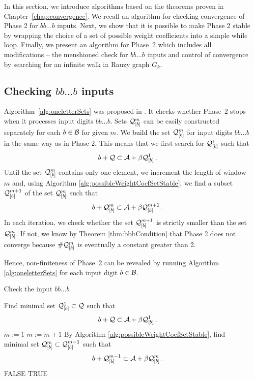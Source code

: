 

In this section, we introduce algorithms based on the theorems proven in Chapter~\ref{chap:convergence}. We recall an algorithm for checking convergence of Phase 2 for $bb\dots b$ inputs. Next, we show that it is possible to make Phase 2 stable by wrapping the choice of a set of possible weight coefficients into a simple while loop. Finally, we present an algorithm for Phase~2 which includes all modifications -- the menshioned check for $bb\dots b$ inputs and control of convergence by searching for an infinite walk in Rauzy graph $G_k$.

\subsection*{Checking $bb\dots b$ inputs}

Algorithm~\ref{alg:oneletterSets} was proposed in \cite{vu}. It checks whether Phase~2 stops when it processes input digits $bb\dots b$.
Sets $\mathcal{Q}_{[\scriptstyle b]}^{\scriptstyle m}$  can be easily constructed separately for each $b\in\mathcal{B}$ for given $m$. We build the set $\mathcal{Q}_{[\scriptstyle b]}^{\scriptstyle m}$ for input digits $bb\dots b$ in the same way as in Phase 2. This means that we first search for $\mathcal{Q}_{[\scriptstyle b]}^{\scriptstyle 1}$ such that 
$$
b + \mathcal{Q} \subset \mathcal{A} + \beta \mathcal{Q}_{[\scriptstyle b]}^{\scriptstyle 1}\,.
$$
Until the set $\mathcal{Q}_{[\scriptstyle b]}^{\scriptstyle m}$ contains only one element, we increment the length of  window $m$ and, using Algorithm \ref{alg:possibleWeightCoefSetStable}, we find a subset $\mathcal{Q}_{[\scriptstyle b]}^{\scriptstyle m+1}$ of the set $\mathcal{Q}_{[\scriptstyle b]}^{\scriptstyle m}$ such that
$$
b + \mathcal{Q}_{[\scriptstyle b]}^{\scriptstyle m} \subset \mathcal{A} + \beta \mathcal{Q}_{[\scriptstyle b]}^{\scriptstyle m+1}\,.
$$
In each iteration, we check whether the set $\mathcal{Q}_{[\scriptstyle b]}^{\scriptstyle m+1}$ is strictly smaller than the set $\mathcal{Q}_{[\scriptstyle b]}^{\scriptstyle m}$. If not, we know by Theorem \ref{thm:bbbCondition} that Phase 2 does not converge because $\#\mathcal{Q}_{[\scriptstyle b]}^{\scriptstyle m}$ is eventually a constant greater than 2.

Hence, non-finiteness of Phase~2 can be revealed by running Algorithm \ref{alg:oneletterSets} for each input digit $b\in\mathcal{B}$.
\begin{algorithm}
  \caption{Check the input $bb\dots b$}
    \label{alg:oneletterSets}
  \begin{algorithmic}[1]
    \STATE Find minimal set $\mathcal{Q}_{[\scriptstyle b]}^{\scriptstyle 1} \subset \mathcal{Q}$ such that
      $$
      b + \mathcal{Q} \subset \mathcal{A} + \beta \mathcal{Q}_{[\scriptstyle b]}^{\scriptstyle 1}\,.
      $$
      \vspace{-20pt}
    \STATE $m:=1$
        \STATE $m:= m +1$
        \STATE By Algorithm \ref{alg:possibleWeightCoefSetStable}, find minimal set $\mathcal{Q}_{[\scriptstyle b]}^{\scriptstyle m} \subset \mathcal{Q}_{[\scriptstyle b]}^{\scriptstyle m-1}$ such that
          $$
          b + \mathcal{Q}_{[\scriptstyle b]}^{\scriptstyle m-1} \subset \mathcal{A} + \beta \mathcal{Q}_{[\scriptstyle b]}^{\scriptstyle m}\,.
          $$  
          \vspace{-20pt}
            \RETURN FALSE
        \ENDIF
    \ENDWHILE  
    \RETURN TRUE
  \end{algorithmic}
\end{algorithm}


